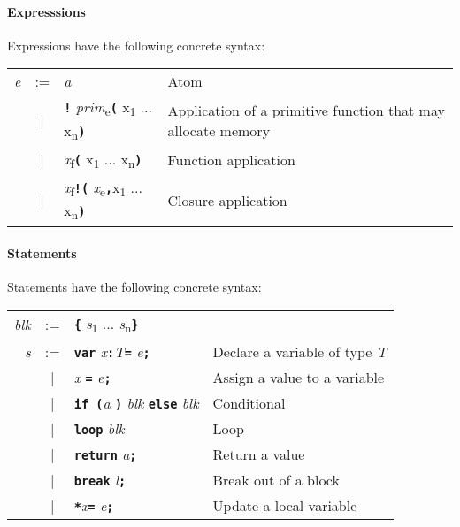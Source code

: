 \documentclass{book}
\newcommand{\kw}[1]{\textbf{\texttt{#1}}}
\newcommand{\metavar}[1]{\textit{#1}}
\begin{document}
\paragraph{Expresssions}
Expressions have the following concrete syntax:

\begin{tabular}{rcll}
\metavar{e} & := & \metavar{a} 
                 & Atom \\
            & |  & \kw{!} \metavar{prim}\textsubscript{e}\kw{(} x\textsubscript{1} ... x\textsubscript{n}\kw{)}            
                 & Application of a primitive function that may allocate memory \\
            & |  & \metavar{x}\textsubscript{f}\kw{(} x\textsubscript{1} ... x\textsubscript{n}\kw{)}
                 & Function application \\
            & |  & \metavar{x}\textsubscript{f}\kw{!(} \metavar{x}\textsubscript{e}\kw{,}x\textsubscript{1} ... x\textsubscript{n}\kw{)}
                 & Closure application \\
\end{tabular}

\paragraph{Statements}
Statements have the following concrete syntax:

\begin{tabular}{rcll}
\metavar{blk} & := & \kw{\{} \metavar{s}\textsubscript{1} ... \metavar{s}\textsubscript{n}\kw{\}} \\
\metavar{s} & := & \kw{var} \metavar{x}\kw{:}\metavar{T}\kw{=} \metavar{e}\kw{;}
                 & \textrm{Declare a variable of type \metavar{T}} \\
            & |  & \metavar{x} \kw{=} \metavar{e}\kw{;}
                 & \textrm{Assign a value to a variable} \\
            & |  & \kw{if (}\metavar{a} \kw{)} \metavar{blk} \kw{else} \metavar{blk}
                 & \textrm{Conditional} \\
            & |  & \kw{loop} \metavar{blk}
                 & \textrm{Loop} \\
            & |  & \kw{return} \metavar{a}\kw{;}
                 & \textrm{Return a value} \\
            & |  & \kw{break} \metavar{l}\kw{;}
                 & \textrm{Break out of a block} \\
            & |  & \kw{*}\metavar{x}\kw{=} \metavar{e}\kw{;}
                 & \textrm{Update a local variable} \\
\end{tabular}
\end{document}
